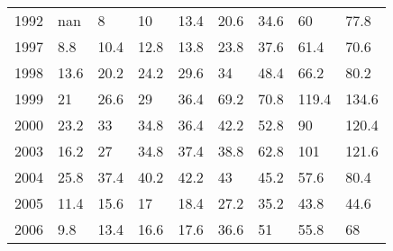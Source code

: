 \documentclass{standalone}
\begin{document}
\begin{tabular}{lllllllll}
1992 & nan  & 8    & 10   & 13.4 & 20.6 & 34.6  & 60    & 77.8  \\
1997 & 8.8  & 10.4 & 12.8 & 13.8 & 23.8 & 37.6  & 61.4  & 70.6  \\
1998 & 13.6 & 20.2 & 24.2 & 29.6 & 34   & 48.4  & 66.2  & 80.2  \\
1999 & 21   & 26.6 & 29   & 36.4 & 69.2 & 70.8  & 119.4 & 134.6 \\
2000 & 23.2 & 33   & 34.8 & 36.4 & 42.2 & 52.8  & 90    & 120.4 \\
2003 & 16.2 & 27   & 34.8 & 37.4 & 38.8 & 62.8  & 101   & 121.6 \\
2004 & 25.8 & 37.4 & 40.2 & 42.2 & 43   & 45.2  & 57.6  & 80.4  \\
2005 & 11.4 & 15.6 & 17   & 18.4 & 27.2 & 35.2  & 43.8  & 44.6  \\
2006 & 9.8  & 13.4 & 16.6 & 17.6 & 36.6 & 51    & 55.8  & 68    \\
\bottomrule
\end{tabular}
 
\end{document}
